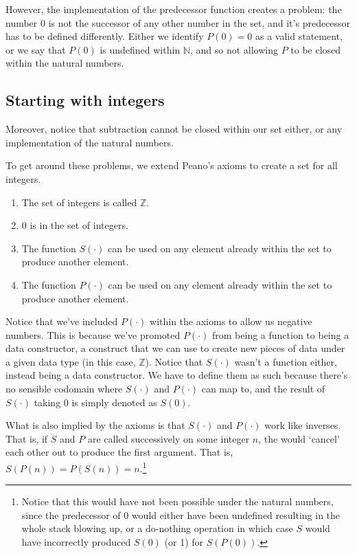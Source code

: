 \documentclass{article}
\newcommand{\N}{\mathbb{N}}
\newcommand{\Z}{\mathbb{Z}}
\begin{document}
However, the implementation of the predecessor function creates a problem: the number 0 is not the successor of any other number in the set, and it's predecessor has to be defined differently. Either we identify $P(0) = 0$ as a valid statement, or we say that $P(0)$ is undefined within $\N$, and so not allowing $P$ to be closed within the natural numbers.

\subsection*{Starting with integers}

Moreover, notice that subtraction cannot be closed within our set either, or any implementation of the natural numbers.

To get around these problems, we extend Peano's axioms to create a set for all integers.
\begin{enumerate}
\item The set of integers is called $\Z$.
\item 0 is in the set of integers.
\item The function $S(\cdot)$ can be used on any element already within the set to produce another element.
\item The function $P(\cdot)$ can be used on any element already within the set to produce another element.
\end{enumerate}
Notice that we've included $P(\cdot)$ within the axioms to allow us negative numbers. This is because we've promoted $P(\cdot)$ from being a function to being a data constructor, a construct that we can use to create new pieces of data under a given data type (in this case, $\Z$). Notice that $S(\cdot)$ wasn't a function either, instead being a data constructor. We have to define them as such because there's no sensible codomain where $S(\cdot)$ and $P(\cdot)$ can map to, and the result of $S(\cdot)$ taking 0 is simply denoted as $S(0)$.

What is also implied by the axioms is that $S(\cdot)$ and $P(\cdot)$ work like inverses. That is, if $S$ and $P$ are called successively on some integer $n$, the would `cancel' each other out to produce the first argument. That is, $S(P(n)) = P(S(n)) = n$.\footnote{Notice that this would have not been possible under the natural numbers, since the predecessor of 0 would either have been undefined resulting in the whole stack blowing up, or a do-nothing operation in which case $S$ would have incorrectly produced $S(0)$ (or 1) for $S(P(0))$.}
\end{document}
